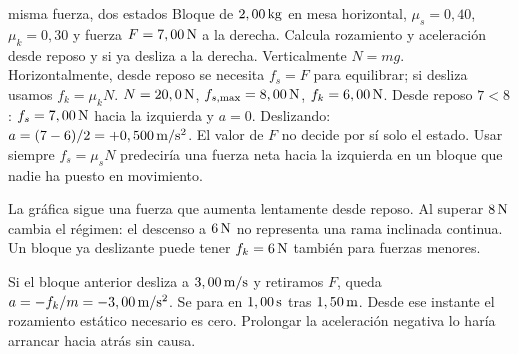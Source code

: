\documentclass[11pt,a4paper]{article}
\begin{document}
\begin{examplebox}{misma fuerza, dos estados}
 Bloque de $2,00\,\mathrm{kg}$ en mesa horizontal,
$\mu_s=0,40$, $\mu_k=0,30$ y fuerza $F=7,00\,\mathrm{N}$ a la derecha.
Calcula rozamiento y aceleraci\'on desde reposo y si ya desliza a la derecha.
\solutionblock
{} Verticalmente $N=mg$. Horizontalmente, desde reposo se necesita
$f_s=F$ para equilibrar; si desliza usamos $f_k=\mu_kN$.
 $N=20,0\,\mathrm{N}$, $f_{s,\max}=8,00\,\mathrm{N}$, $f_k=6,00\,\mathrm{N}$.
Desde reposo $7<8$: $f_s=7,00\,\mathrm{N}$ hacia la izquierda y $a=0$.
Deslizando: $a=(7-6)/2=+0,500\,\mathrm{m/s^2}$.
 El valor de $F$ no decide por s\'i solo el estado.
Usar siempre $f_s=\mu_sN$ predecir\'ia una fuerza neta hacia la izquierda en un
bloque que nadie ha puesto en movimiento.
\begin{center}
\end{center}
La gr\'afica sigue una fuerza que aumenta lentamente desde reposo.
Al superar $8\,\mathrm{N}$ cambia el r\'egimen: el descenso a $6\,\mathrm{N}$ no representa una
rama inclinada continua. Un bloque ya deslizante puede tener $f_k=6\,\mathrm{N}$
tambi\'en para fuerzas menores.
\end{examplebox}

Si el bloque anterior desliza a $3,00\,\mathrm{m/s}$ y retiramos $F$, queda
$a=-f_k/m=-3,00\,\mathrm{m/s^2}$. Se para en $1,00\,\mathrm{s}$ tras $1,50\,\mathrm{m}$.
Desde ese instante el rozamiento est\'atico necesario es cero.
Prolongar la aceleraci\'on negativa lo har\'ia arrancar hacia atr\'as sin causa.
\end{document}
